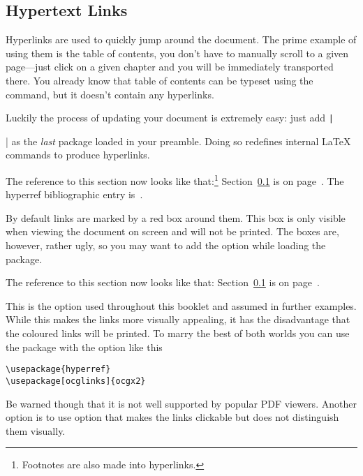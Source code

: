 \subsection{Hypertext Links}\label{hyperlinks}

Hyperlinks are used to quickly jump around the document. The prime example of
using them is the table of contents, you don't have to manually scroll to a
given page---just click on a given chapter and you will be immediately
transported there. You already know that table of contents can be typeset using
the  command, but it doesn't contain any hyperlinks.

Luckily the process of updating your document is extremely easy: just add
\texttt|\usepackage{hyperref}| as the \emph{last} package loaded in
your preamble. Doing so redefines internal \LaTeX{} commands to produce
hyperlinks.
\begin{example}
\hypersetup{
  hidelinks,
  pdfborder=0 0 1,
}
\usepackage{hyperref}
The reference to this section
now looks like that:\footnote{
  Footnotes are also
  made into hyperlinks.}
Section~\ref{hyperlinks} is
on page~\pageref{hyperlinks}.
The hyperref bibliographic
entry is~\cite{pack:hyperref}.
\end{example}
By default links are marked by a red box around them. This box
is only visible when viewing the document on screen and will not be printed.
The boxes are, however, rather ugly, so you may want to add the 
option while loading the package.
\begin{example}
\usepackage[
  colorlinks
]{hyperref}
The reference to this section
now looks like that:
Section~\ref{hyperlinks} is
on page~\pageref{hyperlinks}.
\end{example}
This is the option used throughout this booklet and assumed in further
examples. While this makes the links more visually appealing, it has the
disadvantage that the coloured links will be printed. To marry the best of both
worlds you can use the  package with the option
 like this
\begin{code}  
\begin{verbatim}
\usepackage{hyperref}
\usepackage[ocglinks]{ocgx2}
\end{verbatim}
\end{code}
Be warned though that it is not well supported by popular PDF viewers. Another
option is to use option  that makes the links clickable but
does not distinguish them visually.

